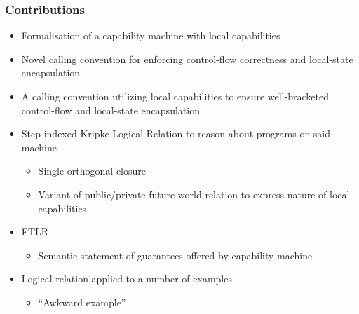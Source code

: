 \documentclass{beamer}
\begin{document}
\begin{frame}
\end{frame}

\begin{frame}
  \frametitle{Contributions}
  \begin{itemize}
    \item Formalisation of a capability machine with local capabilities
    \item Novel calling convention for enforcing control-flow correctness and local-state encapsulation
    \item A calling convention utilizing local capabilities to ensure well-bracketed control-flow and local-state encapsulation
    \item Step-indexed Kripke Logical Relation to reason about programs on said machine
      \begin{itemize}
        \item Single orthogonal closure
        \item Variant of public/private future world relation to express nature of local capabilities
      \end{itemize}
    \item FTLR
      \begin{itemize}
      \item Semantic statement of guarantees offered by capability machine
      \end{itemize}
    \item Logical relation applied to a number of examples
      \begin{itemize}
      \item ``Awkward example''
      \end{itemize}
    \end{itemize}
\end{frame}
\end{document}
